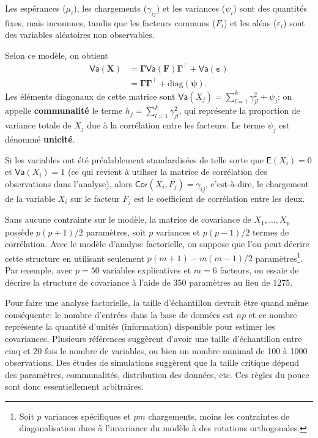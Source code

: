 \documentclass[
  11pt,
  letterpaper,
]{scrbook}
\theoremstyle{definition}
\theoremstyle{remark}
\begin{document}
Les espérances (\(\mu_i\)), les chargements (\(\gamma_{ij}\)) et les
variances (\(\psi_i\)) sont des quantités fixes, mais inconnues, tandis
que les facteurs communs (\(F_i\)) et les aléas (\(\varepsilon_i\)) sont
des variables aléatoires non observables.

Selon ce modèle, on obtient \begin{align*}
\mathsf{Va}(\boldsymbol{X}) &= \boldsymbol{\Gamma}\mathsf{Va}(\boldsymbol{F})\boldsymbol{\Gamma}^\top + \mathsf{Va}(\boldsymbol{\varepsilon})\\
& = \boldsymbol{\Gamma}\boldsymbol{\Gamma}^\top + \mathrm{diag}(\boldsymbol{\psi}).
\end{align*} Les éléments diagonaux de cette matrice sont
\(\mathsf{Va}(X_j) = \sum_{l=1}^k \gamma_{jl}^2 + \psi_j\): on appelle
\textbf{communalité} le terme \(h_j = \sum_{l=1}^k \gamma_{jl}^2\), qui
représente la proportion de variance totale de \(X_j\) due à la
corrélation entre les facteurs. Le terme \(\psi_j\) est dénommé
\textbf{unicité}.

Si les variables ont été préalablement standardisées de telle sorte que
\(\mathsf{E}(X_i)=0\) et \(\mathsf{Va}(X_i)=1\) (ce qui revient à
utiliser la matrice de corrélation des observations dans l'analyse),
alors \(\mathsf{Cor}(X_i, F_j)=\gamma_{ij}\), c'est-à-dire, le
chargement de la variable \(X_i\) sur le facteur \(F_j\) est le
coefficient de corrélation entre les deux.

Sans aucune contrainte sur le modèle, la matrice de covariance de
\(X_1, \ldots, X_p\) possède \(p(p+1)/2\) paramètres, soit \(p\)
variances et \(p(p-1)/2\) termes de corrélation. Avec le modèle
d'analyse factorielle, on suppose que l'on peut décrire cette structure
en utilisant seulement \(p(m+1) - m(m-1)/2\) paramètres\footnote{Soit
  \(p\) variances spécifiques et \(pm\) chargements, moins les
  contraintes de diagonalisation dues à l'invariance du modèle à des
  rotations orthogonales.}. Par exemple, avec \(p=50\) variables
explicatives et \(m=6\) facteurs, on essaie de décrire la structure de
covariance à l'aide de 350 paramètres au lieu de 1275.

Pour faire une analyse factorielle, la taille d'échantillon devrait être
quand même conséquente: le nombre d'entrées dans la base de données est
\(np\) et ce nombre représente la quantité d'unités (information)
disponible pour estimer les covariances. Plusieurs références suggèrent
d'avoir une taille d'échantillon entre cinq et 20 fois le nombre de
variables, ou bien un nombre minimal de 100 à 1000 observations. Des
études de simulations suggèrent que la taille critique dépend des
paramètres, communalités, distribution des données, etc. Ces règles du
pouce sont donc essentiellement arbitraires.
\end{document}
